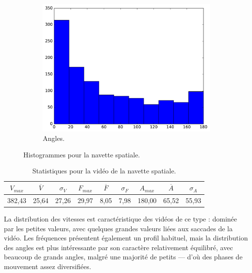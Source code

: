 \begin{figure}[!htbp]
\begin{subfigure}[t]{\subImgWclicks}
			\includegraphics[width=\textwidth]{figures/ch3/spaceA_angle}
			\caption{Angles.}
			\label{fig:spaceA_angle}
		\end{subfigure}
		\caption[Histogrammes pour la navette spatiale]{Histogrammes pour la navette spatiale.}
		\label{fig:histSpace}
	\end{figure}
	
\begin{table}
	\centering
	\begin{tabular}{c c c c c c c c c}
		$V_{max}$	& $\overline{V}$	& $\sigma_{V}$	& $F_{max}$	& $\overline{F}$	& $\sigma_{F}$	& $A_{max}$	& $\overline{A}$	& $\sigma_{A}$	\bigstrut[b] \\ \hline

		382,43		& 25,64				& 27,26			& 29,97		& 8,05				& 7,98			& 180,00	& 65,52				& 55,93			\bigstrut[t] \\
	\end{tabular}
	\caption[Statistiques pour la vidéo de la navette spatiale]{Statistiques pour la vidéo de la navette spatiale.}
	\label{tab:spaceA_stats}
\end{table}
	
	La distribution des vitesses est caractéristique des vidéos de ce type : dominée par les petites valeurs, avec quelques grandes valeurs liées aux saccades de la vidéo. Les fréquences présentent également un profil habituel, mais la distribution des angles est plus intéressante par son caractère relativement équilibré, avec beaucoup de grands angles, malgré une majorité de petits --- d'où des phases de mouvement assez diversifiées.
	
